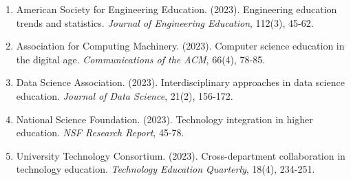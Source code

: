 \documentclass[12pt]{article}
\begin{document}
\begin{enumerate}
    \item American Society for Engineering Education. (2023). Engineering education trends and statistics. \textit{Journal of Engineering Education}, 112(3), 45-62.
    
    \item Association for Computing Machinery. (2023). Computer science education in the digital age. \textit{Communications of the ACM}, 66(4), 78-85.
    
    \item Data Science Association. (2023). Interdisciplinary approaches in data science education. \textit{Journal of Data Science}, 21(2), 156-172.
    
    \item National Science Foundation. (2023). Technology integration in higher education. \textit{NSF Research Report}, 45-78.
    
    \item University Technology Consortium. (2023). Cross-department collaboration in technology education. \textit{Technology Education Quarterly}, 18(4), 234-251.
\end{enumerate}
\end{document}
